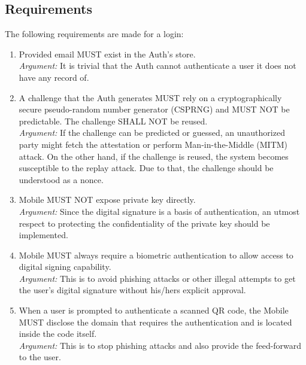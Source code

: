     \subsection{Requirements}
    The following requirements are made for a login:
        \begin{enumerate}
            \item Provided email MUST exist in the Auth's store.\\
            \textit{Argument:} It is trivial that the Auth cannot authenticate a user it does not have any record
                               of.            

            \item A challenge that the Auth generates MUST rely on a cryptographically secure pseudo-random number 
                  generator (CSPRNG) and MUST NOT be predictable. The challenge SHALL NOT be reused.\\
            \textit{Argument:} If the challenge can be predicted or guessed, an unauthorized party might fetch the
                               attestation or perform Man-in-the-Middle (MITM) attack. On the other hand, if the
                               challenge is reused, the system becomes susceptible to the replay attack. Due to that, 
                               the challenge should be understood as a nonce.

            \item Mobile MUST NOT expose private key directly.\\
            \textit{Argument:} Since the digital signature is a basis of authentication, an utmost respect to 
                               protecting the confidentiality of the private key should be implemented.

            \item Mobile MUST always require a biometric authentication to allow access to digital signing 
                  capability.\\        
            \textit{Argument:} This is to avoid phishing attacks or other illegal attempts to get the user's 
                               digital signature without his/hers explicit approval.

            \item When a user is prompted to authenticate a scanned QR code, the Mobile MUST disclose the domain that 
                  requires the authentication and is located inside the code itself.\\
            \textit{Argument:} This is to stop phishing attacks and also provide the feed-forward to the user.


\end{enumerate}
